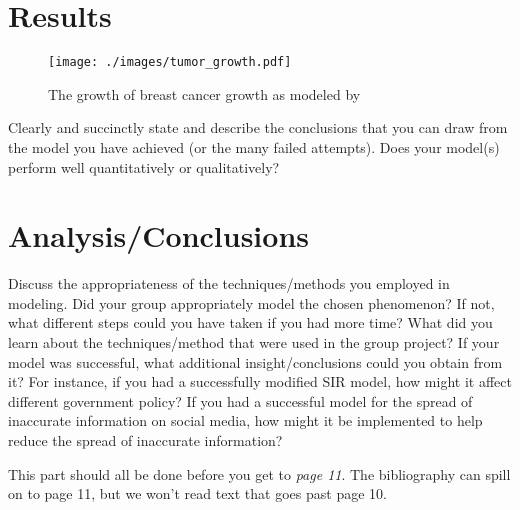 \documentclass[11pt]{amsart}
\begin{document}
\section{Results}

\begin{figure}[htb]
\begin{center} %
\texttt{[image: ./images/tumor\_growth.pdf]} %
\end{center}
\caption{The growth of breast cancer growth as modeled by
}
\label{fig:MeanSquaredError} %
\end{figure}



Clearly and succinctly state and describe the conclusions that you can draw from the model you have achieved (or the many failed attempts). Does your model(s) perform well quantitatively or qualitatively?

\section{Analysis/Conclusions}

Discuss the appropriateness of the techniques/methods you employed in modeling. Did your group appropriately model the chosen phenomenon? If not, what different steps could you have taken if you had more time? What did you learn about the techniques/method that were used in the group project? If your model was successful, what additional insight/conclusions could you obtain from it? For instance, if you had a successfully modified SIR model, how might it affect different government policy? If you had a successful model for the spread of inaccurate information on social media, how might it be implemented to help reduce the spread of inaccurate information?



This part should all be done before you get to \emph{page 11}.  The bibliography can spill on to page 11, but we won't read text that goes past page 10.

\appendix
\end{document}
